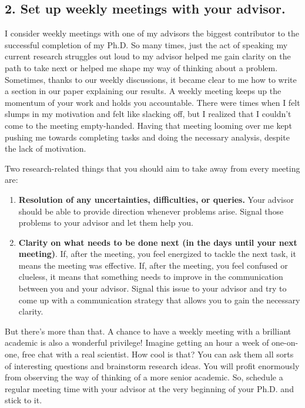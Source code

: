 \documentclass[10pt,twocolumn]{article}
\begin{document}
\subsection*{2. Set up weekly meetings with your advisor.}

I consider weekly meetings with one of my advisors the biggest contributor to the successful completion of my Ph.D. So many times, just the act of speaking my current research struggles out loud to my advisor helped me gain clarity on the path to take next or helped me shape my way of thinking about a problem. Sometimes, thanks to our weekly discussions, it became clear to me how to write a section in our paper explaining our results. A weekly meeting keeps up the momentum of your work and holds you accountable. There were times when I felt slumps in my motivation and felt like slacking off, but I realized that I couldn't come to the meeting empty-handed. Having that meeting looming over me kept pushing me towards completing tasks and doing the necessary analysis, despite the lack of motivation.

Two research-related things that you should aim to take away from every meeting are:

\begin{enumerate}
\item \textbf{Resolution of any uncertainties, difficulties, or queries.} Your advisor should be able to provide direction whenever problems arise. Signal those problems to your advisor and let them help you.
\item \textbf{Clarity on what needs to be done next (in the days until your next meeting)}. If, after the meeting, you feel energized to tackle the next task, it means the meeting was effective. If, after the meeting, you feel confused or clueless, it means that something needs to improve in the communication between you and your advisor. Signal this issue to your advisor and try to come up with a communication strategy that allows you to gain the necessary clarity.
\end{enumerate}

But there’s more than that. A chance to have a weekly meeting with a brilliant academic is also a wonderful privilege! Imagine getting an hour a week of one-on-one, free chat with a real scientist. How cool is that? You can ask them all sorts of interesting questions and brainstorm research ideas. You will profit enormously from observing the way of thinking of a more senior academic. So, schedule a regular meeting time with your advisor at the very beginning of your Ph.D. and stick to it.
\end{document}
